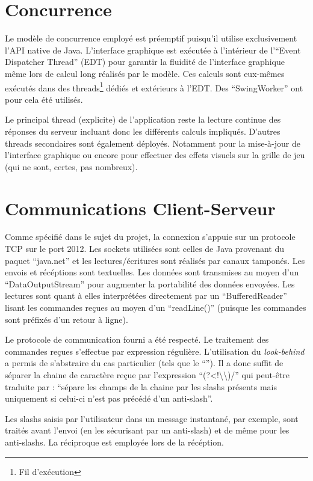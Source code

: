 \documentclass[a4paper, 11pt]{report}
\begin{document}
\section{Concurrence}

Le modèle de concurrence employé est préemptif puisqu'il utilise exclusivement l'API native de Java.
L'interface graphique est exécutée à l'intérieur de l'``Event Dispatcher Thread'' (EDT)
pour garantir la fluidité de l'interface graphique même lors de calcul long réalisés par le modèle.
Ces calculs sont eux-mêmes exécutés dans des threads\footnote{Fil d'exécution} dédiés et
extérieurs à l'EDT. Des ``SwingWorker'' ont pour cela été utilisés.

Le principal thread (explicite) de l'application reste la lecture continue des réponses du serveur
incluant donc les différents calculs impliqués.
D'autres threads secondaires sont également déployés. Notamment pour la mise-à-jour de l'interface
graphique ou encore pour effectuer des effets visuels sur la grille de jeu
(qui ne sont, certes, pas nombreux).


\section{Communications Client-Serveur}

Comme spécifié dans le sujet du projet, la connexion s'appuie sur un protocole TCP sur le port 2012.
Les sockets utilisées sont celles de Java provenant du paquet ``java.net''
et les lectures/écritures sont réalisés par canaux tamponés. Les envois et récéptions
sont textuelles. Les données sont transmises au moyen d'un ``DataOutputStream'' pour augmenter
la portabilité des données envoyées.
Les lectures sont quant à elles interprétées directement par un ``BufferedReader'' lisant
les commandes reçues au moyen d'un ``readLine()'' (puisque les commandes sont préfixés d'un retour
à ligne).

Le protocole de communication fourni a été respecté. Le traitement des commandes
reçues s'effectue par expression régulière. L'utilisation du \emph{look-behind} a permis
de s'abstraire du cas particulier (tels que le ``\/''). Il a donc suffit de séparer la
chaine de caractère reçue par l'expression ``(?<!\textbackslash{}\textbackslash{})/'' qui peut-être traduite par :
``sépare les champs de la chaine par les slashs présents mais uniquement si celui-ci n'est pas précédé
d'un anti-slash''.

Les slashs saisis par l'utilisateur dans un message instantané, par exemple, sont traités avant
l'envoi (en les sécurisant par un anti-slash) et de même pour les anti-slashs. La réciproque est
employée lors de la récéption.
\end{document}
